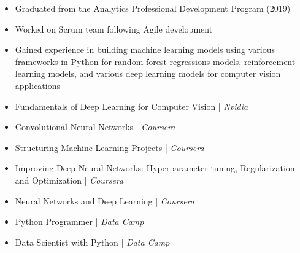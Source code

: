 \documentclass[10pt,a4paper,ragged2e,withhyper]{altacv}
\begin{document}
\begin{paracol}{2}
\divider

\begin{itemize}
\item  Graduated from the Analytics Professional Development Program (2019)
\item  Worked on Scrum team following Agile development
\item  Gained experience in building machine learning models using various frameworks in Python for random forest regressions models, reinforcement learning models, and various deep learning models for computer vision applications
\end{itemize}





\begin{itemize}
\item Fundamentals of Deep Learning for Computer Vision | \textit{Nvidia}
\item Convolutional Neural Networks | \textit{Coursera}
\item Structuring Machine Learning Projects | \textit{Coursera}
\item Improving Deep Neural Networks: Hyperparameter tuning, Regularization and Optimization | \textit{Coursera}
\item Neural Networks and Deep Learning | \textit{Coursera}
\item Python Programmer | \textit{Data Camp}
\item Data Scientist with Python | \textit{Data Camp}
\end{itemize}



\end{paracol}
\end{document}
